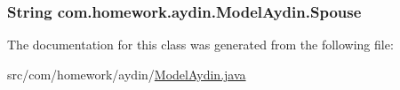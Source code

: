 \subsubsection[{\texorpdfstring{Spouse}{Spouse}}]{\setlength{\rightskip}{0pt plus 5cm}String com.\+homework.\+aydin.\+Model\+Aydin.\+Spouse\hspace{0.3cm}{\ttfamily [private]}}\hypertarget{classcom_1_1homework_1_1aydin_1_1_model_aydin_a0583b3beb1421203f08c5f10e6c5e5e3}{}\label{classcom_1_1homework_1_1aydin_1_1_model_aydin_a0583b3beb1421203f08c5f10e6c5e5e3}


The documentation for this class was generated from the following file\+:\begin{DoxyCompactItemize}
\item 
src/com/homework/aydin/\hyperlink{_model_aydin_8java}{Model\+Aydin.\+java}\end{DoxyCompactItemize}
